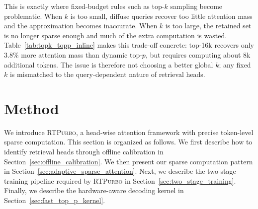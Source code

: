 \documentclass{llmxive}
\providecommand{\name}{{\textsc{RTPurbo}}\xspace}
\begin{document}
This is exactly where fixed-budget rules such as top-$k$ sampling become problematic. When $k$ is too small, diffuse queries recover too little attention mass and the approximation becomes inaccurate. When $k$ is too large, the retained set is no longer sparse enough and much of the extra computation is wasted. Table~\ref{tab:topk_topp_inline} makes this trade-off concrete: top-16k recovers only 3.8\% more attention mass than dynamic top-$p$, but requires computing about 8k additional tokens. The issue is therefore not choosing a better global $k$; any fixed $k$ is mismatched to the query-dependent nature of retrieval heads.





\section{Method}

We introduce \name, a head-wise attention framework with precise token-level sparse computation. This section is organized as follows. We first describe how to identify retrieval heads through offline calibration in Section~\ref{sec:offline_calibration}. We then present our sparse computation pattern in Section~\ref{sec:adaptive_sparse_attention}. Next, we describe the two-stage training pipeline required by \name in Section~\ref{sec:two_stage_training}. Finally, we describe the hardware-aware decoding kernel in Section~\ref{sec:fast_top_p_kernel}.
\end{document}
